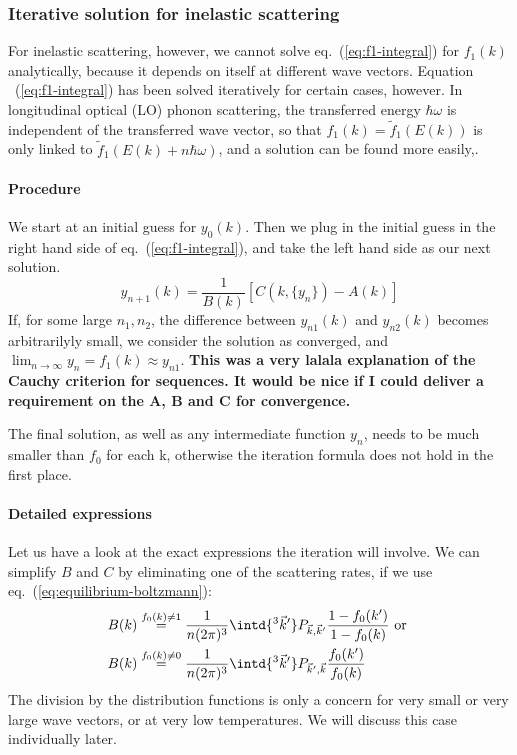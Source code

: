 \documentclass[physics,phd,nolot,nolof]{uccthesis}%
\newcommand{\alert}[1]{\textbf{\color{red}#1}}
\begin{document}
{\subsubsection{Iterative solution for inelastic scattering}
For inelastic scattering, however, we cannot solve eq.~(\ref{eq:f1-integral}) for $f_1(k)$ analytically, because it depends on itself at different wave vectors.
Equation ~(\ref{eq:f1-integral}) has been solved iteratively for certain cases, however.
In longitudinal optical (LO) phonon scattering, the transferred energy $\hbar \omega$ is independent of the transferred wave vector, so that $f_1(k)=\tilde{f}_1(E(k))$ is only linked to $\tilde{f}_1(E(k) + n\hbar \omega)$, and a solution can be found more easily,\cite{Delves1959,Fletcher-Butcher}.
\paragraph*{Procedure}
We start at an initial guess for $y_0(k)$.
Then we plug in the initial guess in the right hand side of eq.~(\ref{eq:f1-integral}), and take the left hand side as our next solution.
\begin{equation}
  y_{n+1}(k) = \frac{1}{B(k)}\left[ C(k, \{y_n\}) -A(k) \right]
  \label{eq:f1-iteration}
\end{equation}
If, for some large $n_1, n_2$, the difference between $y_{n1}(k)$ and $y_{n2}(k)$ becomes arbitrarilyly small, we consider the solution as converged, 
and $\lim_{n\to\infty}y_n =f_1(k)\approx y_{n1}$.
\alert{This was a very lalala explanation of the Cauchy criterion for 
sequences. It would be nice if I could deliver a requirement on the A, B and C for convergence.} 

The final solution, as well as any intermediate function $y_n$, needs to be much
smaller than $f_0$ for each k, otherwise the iteration formula 
does not hold in the first place.
\paragraph*{Detailed expressions}
Let us have a look at the exact expressions the iteration will involve.
We can simplify $B$ and $C$ by eliminating one of the 
scattering rates, if we use eq.~(\ref{eq:equilibrium-boltzmann}): 
\begin{equation}
  \begin{split}
&  B(k)\stackrel{f_0(k)\neq 1}{=}
\frac{1}{n(2\pi)^3} \intd{^3\vec k'}  
  		P_{\vec k,\vec k'}
			\frac{1-f_0(k')}{1-f_0(k)}
			\text{ or }\\
&  B(k)\stackrel{f_0(k)\neq 0}{=}
\frac{1}{n(2\pi)^3} \intd{^3\vec k'  }
  		P_{\vec k',\vec k}
			\frac{f_0(k')}{f_0(k)}
  \end{split}
  \label{eq:Bk}
\end{equation}
The division by the distribution functions is only a concern for very small or very large wave vectors, or at very low temperatures. We will discuss this case individually later.

}
\end{document}
